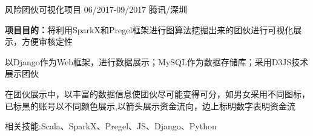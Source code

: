 \begin{cventries}
    \cventry
    { } %
    {风险团伙可视化项目} %
    {06/2017-09/2017} %
    {腾讯/深圳} %
    {
    \vspace{-8pt}
      \begin{cvitems} %
      	\item{\textbf{项目目的：}将利用SparkX和Pregel框架进行图算法挖掘出来的团伙进行可视化展示，方便审核定性}
        \item {以Django作为Web框架，进行数据展示；MySQL作为数据存储库；采用D3JS技术展示团伙}
        \item {在团伙展示中，以丰富的数据信息使团伙尽可能变得可分，如男女采用不同图标，已标黑的账号以不同颜色展示,以箭头展示资金流向，边上标明数字表明资金流}
        \item{相关技能:Scala、SparkX、Pregel、JS、Django、Python}
      \end{cvitems}
    }


\end{cventries}
